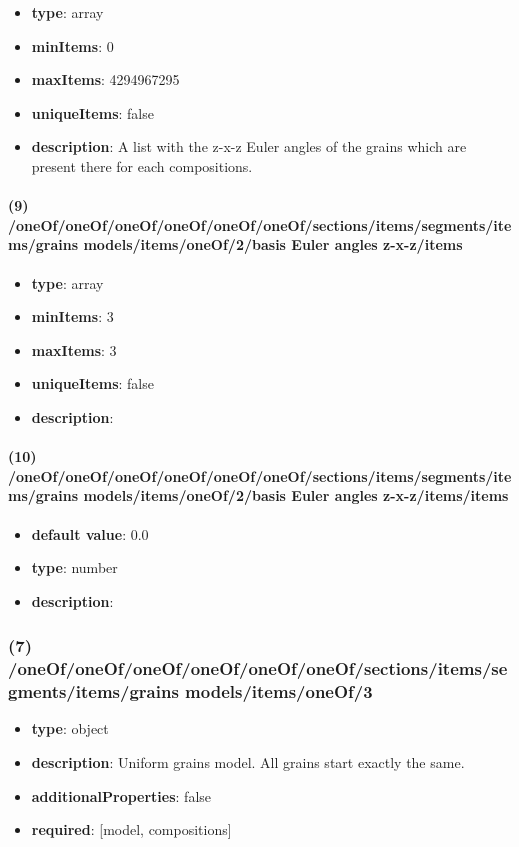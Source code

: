 \begin{itemize}[leftmargin=8em]\item {\bf type}: array
\item {\bf minItems}: 0
\item {\bf maxItems}: 4294967295
\item {\bf uniqueItems}: false
\item {\bf description}: A list with the z-x-z Euler angles of the grains which are present there for each compositions.
\end{itemize}\paragraph{(9) /oneOf/oneOf/oneOf/oneOf/oneOf/oneOf/sections/items/segments/items/grains models/items/oneOf/2/basis Euler angles z-x-z/items}
\begin{itemize}[leftmargin=9em]\item {\bf type}: array
\item {\bf minItems}: 3
\item {\bf maxItems}: 3
\item {\bf uniqueItems}: false
\item {\bf description}: 
\end{itemize}\paragraph{(10) /oneOf/oneOf/oneOf/oneOf/oneOf/oneOf/sections/items/segments/items/grains models/items/oneOf/2/basis Euler angles z-x-z/items/items}
\begin{itemize}[leftmargin=10em]\item {\bf default value}: 0.0
\item {\bf type}: number
\item {\bf description}: 
\end{itemize}\subsubsection{(7) /oneOf/oneOf/oneOf/oneOf/oneOf/oneOf/sections/items/segments/items/grains models/items/oneOf/3}
\begin{itemize}[leftmargin=7em]\item {\bf type}: object
\item {\bf description}: Uniform grains model. All grains start exactly the same.
\item {\bf additionalProperties}: false
\item {\bf required}: [model, compositions]\end{itemize}
